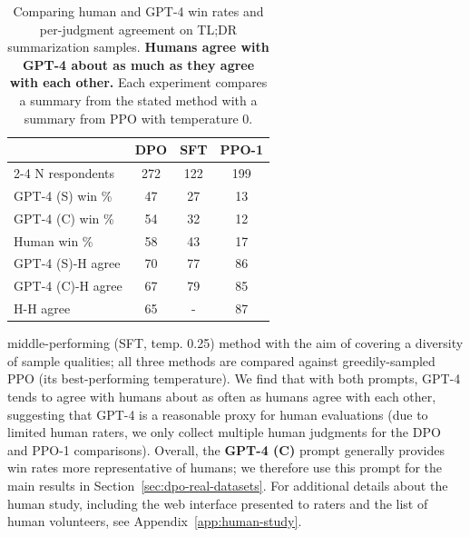 \begin{table}
    \centering
    \small

    \begin{tabular}{lccc}
    \toprule
        & \textbf{DPO} & \textbf{SFT} & \textbf{PPO-1} \\
        \cmidrule(lr){2-4}
        N respondents & 272 & 122 & 199 \\
        \midrule
        GPT-4 (S) win \% & 47 & 27 & 13 \\
        GPT-4 (C) win \% & 54 & 32 & 12 \\
        Human win \% & 58 & 43 & 17 \\
        \midrule
        GPT-4 (S)-H agree & 70 & 77 & 86 \\
        GPT-4 (C)-H agree & 67 & 79 & 85 \\
        H-H agree & 65 & - & 87 \\
        \bottomrule
    \end{tabular}

    \caption{Comparing human and GPT-4 win rates and per-judgment agreement on TL;DR summarization samples. \textbf{Humans agree with GPT-4 about as much as they agree with each other.} Each experiment compares a summary from the stated method with a summary from PPO with temperature 0.}

    \label{tab:human_results}
\end{table}

middle-performing (SFT, temp. 0.25) method with the aim of covering a diversity of sample qualities; all three methods are compared against greedily-sampled PPO (its best-performing temperature). We find that with both prompts, GPT-4 tends to agree with humans about as often as humans agree with each other, suggesting that GPT-4 is a reasonable proxy for human evaluations (due to limited human raters, we only collect multiple human judgments for the DPO and PPO-1 comparisons). Overall, the \textbf{GPT-4 (C)} prompt generally provides win rates more representative of humans; we therefore use this prompt for the main results in Section~\ref{sec:dpo-real-datasets}. For additional details about the human study, including the web interface presented to raters and the list of human volunteers, see Appendix~\ref{app:human-study}.

